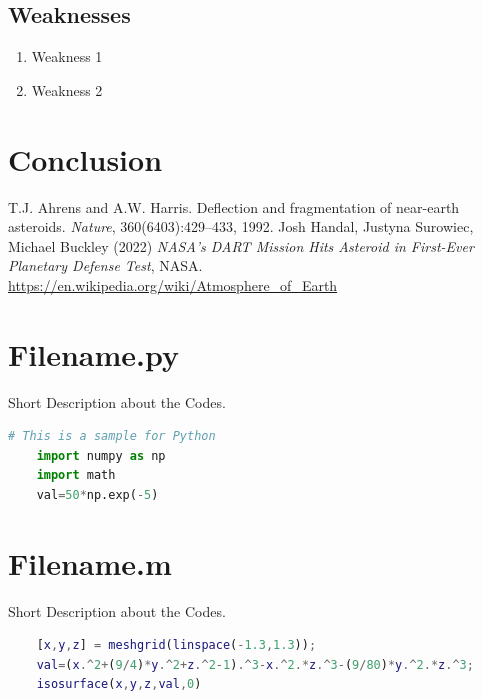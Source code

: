 \documentclass{Setup}
\begin{document}
\subsection{Weaknesses}
\begin{enumerate}
    \item Weakness 1
    \item Weakness 2
\end{enumerate}


\section{Conclusion}
\lipsum[1] %


\begin{thebibliography}{99} %
   T.J. Ahrens and A.W. Harris. Deflection and fragmentation of near-earth asteroids. \textit{Nature}, 360(6403):429–433, 1992.
   Josh Handal, Justyna Surowiec, Michael Buckley (2022) \textit{NASA’s DART Mission Hits Asteroid in First-Ever Planetary Defense Test}, NASA. 
   \url{https://en.wikipedia.org/wiki/Atmosphere_of_Earth}
\end{thebibliography}


\newpage
\begin{appendices}
  \section{Filename.py}

  Short Description about the Codes.

  \begin{lstlisting}[language=Python]
    # This is a sample for Python
    import numpy as np
    import math
    val=50*np.exp(-5)
  \end{lstlisting}
 
  
  \section{Filename.m}

  Short Description about the Codes.

  \begin{lstlisting}[language=Matlab]
    % This is a sample for Matlab
    [x,y,z] = meshgrid(linspace(-1.3,1.3));
    val=(x.^2+(9/4)*y.^2+z.^2-1).^3-x.^2.*z.^3-(9/80)*y.^2.*z.^3;
    isosurface(x,y,z,val,0)
  \end{lstlisting}
\end{appendices}
\end{document}
